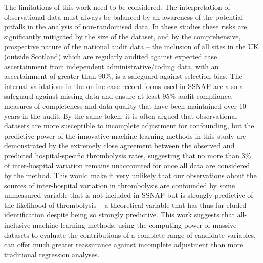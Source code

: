 The limitations of this work need to be considered. The interpretation of observational data must always be balanced by an awareness of the potential pitfalls in the analysis of non-randomised data. In these studies these risks are significantly mitigated by the size of the dataset, and by the comprehensive, prospective nature of the national audit data – the inclusion of all sites in the UK (outside Scotland) which are regularly audited against expected case ascertainment from independent administrative/coding data, with an ascertainment of greater than 90\%, is a safeguard against selection bias. The internal validations in the online case record forms used in SSNAP are also a safeguard against missing data and ensure at least 95\% audit compliance, measures of completeness and data quality that have been maintained over 10 years in the audit. By the same token, it is often argued that observational datasets are more susceptible to incomplete adjustment for confounding, but the predictive power of the innovative machine learning methods in this study are demonstrated by the extremely close agreement between the observed and predicted hospital-specific thrombolysis rates, suggesting that no more than 3\% of inter-hospital variation remains unaccounted for once all data are considered by the method. This would make it very unlikely that our observations about the sources of inter-hospital variation in thrombolysis are confounded by some unmeasured variable that is not included in SSNAP but is strongly predictive of the likelihood of thrombolysis – a theoretical variable that has thus far eluded identification despite being so strongly predictive. This work suggests that all-inclusive machine learning methods, using the computing power of massive datasets to evaluate the contributions of a complete range of candidate variables, can offer much greater reassurance against incomplete adjustment than more traditional regression analyses.

